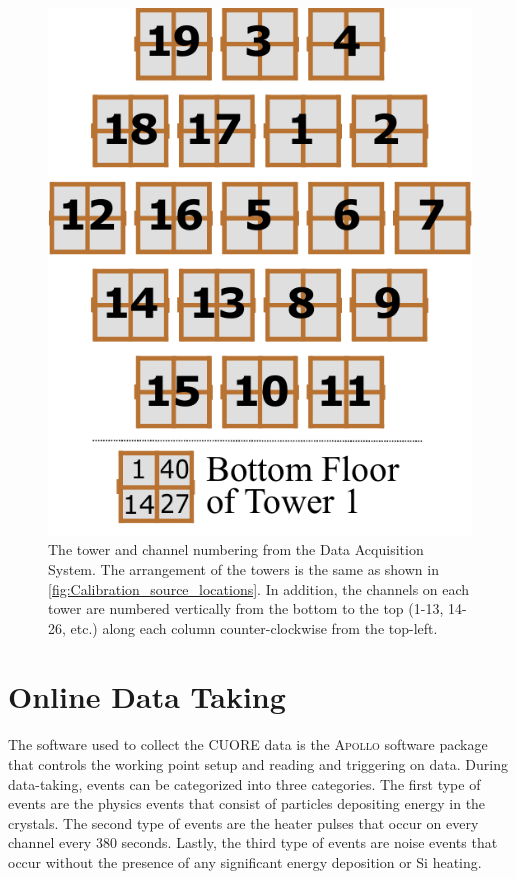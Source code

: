 \begin{figure}
    \centering
    \includegraphics[width=0.5\linewidth]{Figures/Crystals_numbering_only.pdf}
    \caption[The tower and channel numbering from the Data Acquisition System.]
    {The tower and channel numbering from the Data Acquisition System.
    The arrangement of the towers is the same as shown in \autoref{fig:Calibration_source_locations}.
    In addition, the channels on each tower are numbered vertically from the bottom to the top (1-13, 14-26, etc.) along each column counter-clockwise from the top-left.}
    \label{fig:DAQ_tower_numbering}
\end{figure}

\section{Online Data Taking}
\label{sec:Online Data Taking}
The software used to collect the CUORE data is the \textsc{Apollo} software package that controls the working point setup and reading and triggering on data.
During data-taking, events can be categorized into three categories.
The first type of events are the physics events that consist of particles depositing energy in the crystals.
The second type of events are the heater pulses that occur on every channel every 380 seconds.
Lastly, the third type of events are noise events that occur without the presence of any significant energy deposition or Si heating. 
